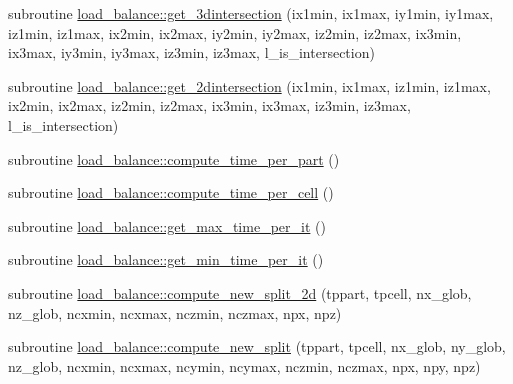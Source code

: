 \begin{DoxyCompactItemize}
\item 
subroutine \hyperlink{namespaceload__balance_a1f27f85178bb29cf23ba30a4fe0dcca4}{load\+\_\+balance\+::get\+\_\+3dintersection} (ix1min, ix1max, iy1min, iy1max, iz1min, iz1max,                                                                                                                   ix2min, ix2max, iy2min, iy2max, iz2min, iz2max,                                                                                                                   ix3min, ix3max, iy3min, iy3max, iz3min, iz3max,                                                                                                                   l\+\_\+is\+\_\+intersection)
\item 
subroutine \hyperlink{namespaceload__balance_a9ba95ccb4742ad1d892ab5ef620c7ab6}{load\+\_\+balance\+::get\+\_\+2dintersection} (ix1min, ix1max, iz1min, iz1max,                                                                                                                   ix2min, ix2max, iz2min, iz2max,                                                                                                                   ix3min, ix3max, iz3min, iz3max,                                                                                                                   l\+\_\+is\+\_\+intersection)
\item 
subroutine \hyperlink{namespaceload__balance_a5c1a9ea3d255e4e91938d5e39c1619c8}{load\+\_\+balance\+::compute\+\_\+time\+\_\+per\+\_\+part} ()
\item 
subroutine \hyperlink{namespaceload__balance_a3372ef5bc3ae8ebdef0d90933fd19319}{load\+\_\+balance\+::compute\+\_\+time\+\_\+per\+\_\+cell} ()
\item 
subroutine \hyperlink{namespaceload__balance_a80526c03cd9a3f83bc80462c7202ed45}{load\+\_\+balance\+::get\+\_\+max\+\_\+time\+\_\+per\+\_\+it} ()
\item 
subroutine \hyperlink{namespaceload__balance_a0103fd1c4bbf143a08380b8784fbeb44}{load\+\_\+balance\+::get\+\_\+min\+\_\+time\+\_\+per\+\_\+it} ()
\item 
subroutine \hyperlink{namespaceload__balance_a18e85039b792c196efea78b39cc3f1d1}{load\+\_\+balance\+::compute\+\_\+new\+\_\+split\+\_\+2d} (tppart, tpcell, nx\+\_\+glob, nz\+\_\+glob,                                       ncxmin, ncxmax, nczmin, nczmax, npx, npz)
\item 
subroutine \hyperlink{namespaceload__balance_aa1f87b6d753beef11f28f62755f25e01}{load\+\_\+balance\+::compute\+\_\+new\+\_\+split} (tppart, tpcell, nx\+\_\+glob, ny\+\_\+glob, nz\+\_\+glob,                                       ncxmin, ncxmax, ncymin, ncymax, nczmin, nczmax, npx, npy, npz)

\end{DoxyCompactItemize}
